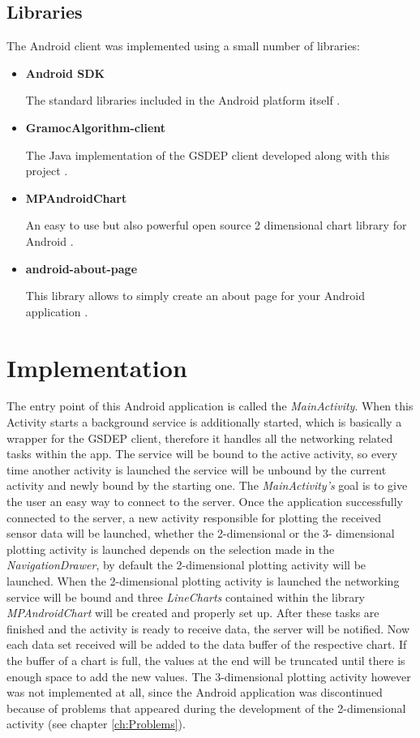 \subsection{Libraries}
The Android client was implemented using a small number of libraries:
\begin{itemize}
    \item \textbf{Android SDK}

    The standard libraries included in the Android platform itself \autocite{AndroidSDK}.

    \item \textbf{GramocAlgorithm-client}

    The Java implementation of the GSDEP client developed along with this project \autocite{GramocAlgorithm-client}.

    \item \textbf{MPAndroidChart}

    An easy to use but also powerful open source 2 dimensional chart library for Android \autocite{MPAndroidChart}.

    \item \textbf{android-about-page}

    This library allows to simply create an about page for your Android application \autocite{android-about-page}.
\end{itemize}

\section{Implementation}
The entry point of this Android application is called the \emph{MainActivity}. When this Activity starts a background service is additionally started, which is basically a wrapper for the GSDEP client, therefore it handles all the networking related tasks within the app. The service will be bound to the active activity, so every time another activity is launched the service will be unbound by the current activity and newly bound by the starting one. The \emph{MainActivity's} goal is to give the user an easy way to connect to the server. Once the application successfully connected to the server, a new activity responsible for plotting the received sensor data will be launched, whether the 2-dimensional or the 3- dimensional plotting activity is launched depends on the selection made in the \emph{NavigationDrawer}, by default the 2-dimensional plotting activity will be launched. When the 2-dimensional plotting activity is launched the networking service will be bound and three \emph{LineCharts} contained within the library \emph{MPAndroidChart} will be created and properly set up. After these tasks are finished and the activity is ready to receive data, the server will be notified. Now each data set received will be added to the data buffer of the respective chart. If the buffer of a chart is full, the values at the end will be truncated until there is enough space to add the new values. The 3-dimensional plotting activity however was not implemented at all, since the Android application was discontinued because of problems that appeared during the development of the 2-dimensional activity (see chapter \vref{ch:Problems}).
